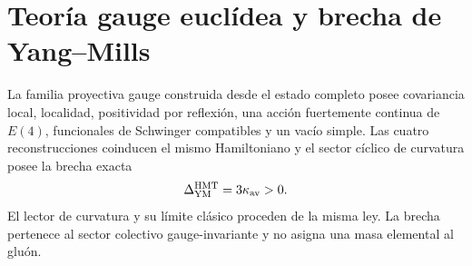 \section{Teoría gauge euclídea y brecha de Yang--Mills}

La familia proyectiva gauge construida desde el estado completo posee
covariancia local, localidad, positividad por reflexión, una acción
fuertemente continua de \(E(4)\), funcionales de Schwinger compatibles y un
vacío simple. Las cuatro reconstrucciones coinducen el mismo Hamiltoniano y
el sector cíclico de curvatura posee la brecha exacta
\[
  \Delta_{\rm YM}^{\rm HMT}=3\kappa_{\rm av}>0.
\]
El lector de curvatura y su límite clásico proceden de la misma ley. La brecha
pertenece al sector colectivo gauge-invariante y no asigna una masa elemental
al gluón.


